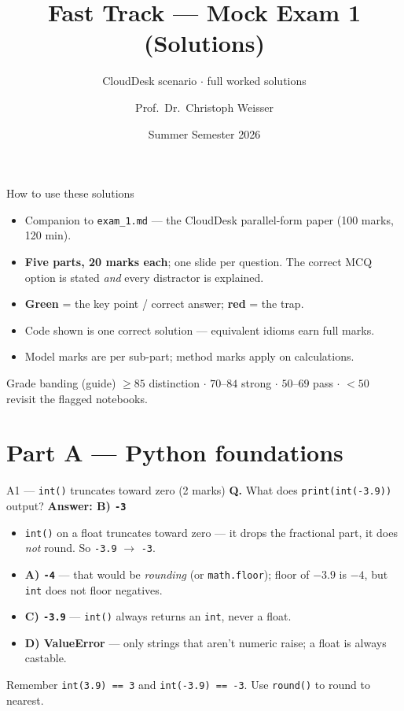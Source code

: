\documentclass[aspectratio=169,11pt]{beamer}
\title{Fast Track --- Mock Exam 1 (Solutions)}
\subtitle{CloudDesk scenario $\cdot$ full worked solutions}
\author{Prof.\ Dr.\ Christoph Weisser}
\institute{HSBI}
\date{Summer Semester 2026}
\begin{document}
\begin{frame}\titlepage\end{frame}

\begin{frame}{How to use these solutions}
\begin{itemize}
  \item Companion to \texttt{exam\_1.md} --- the CloudDesk parallel-form paper (100 marks, 120 min).
  \item \textbf{Five parts, 20 marks each}; one slide per question. The correct MCQ option is stated
        \emph{and} every distractor is explained.
  \item \textbf{Green} = the key point / correct answer; \textbf{red} = the trap.
  \item Code shown is one correct solution --- equivalent idioms earn full marks.
  \item Model marks are per sub-part; method marks apply on calculations.
\end{itemize}
\vspace{0.4em}
\begin{block}{Grade banding (guide)}
\footnotesize $\geq 85$ distinction \; $\cdot$ \; $70$--$84$ strong \; $\cdot$ \; $50$--$69$ pass \; $\cdot$ \; $<50$ revisit the flagged notebooks.
\end{block}
\end{frame}

\section{Part A --- Python foundations}

\begin{frame}[fragile]{A1 --- \texttt{int()} truncates toward zero (2 marks)}
\textbf{Q.} What does \texttt{print(int(-3.9))} output? \hfill \textbf{Answer: B) \texttt{-3}}
\begin{itemize}
  \item \texttt{int()} on a float \textcolor{cred}{truncates toward zero} --- it drops the fractional
        part, it does \emph{not} round. So \texttt{-3.9} $\to$ \texttt{-3}.
  \item \textbf{A) \texttt{-4}} --- that would be \emph{rounding} (or \texttt{math.floor}); floor of
        $-3.9$ is $-4$, but \texttt{int} does not floor negatives.
  \item \textbf{C) \texttt{-3.9}} --- \texttt{int()} always returns an \texttt{int}, never a float.
  \item \textbf{D) ValueError} --- only strings that aren't numeric raise; a float is always castable.
\end{itemize}
\begin{block}{Remember}
\footnotesize \texttt{int(3.9) == 3} and \texttt{int(-3.9) == -3}. Use \texttt{round()} to round to nearest.
\end{block}
\end{frame}
\end{document}
